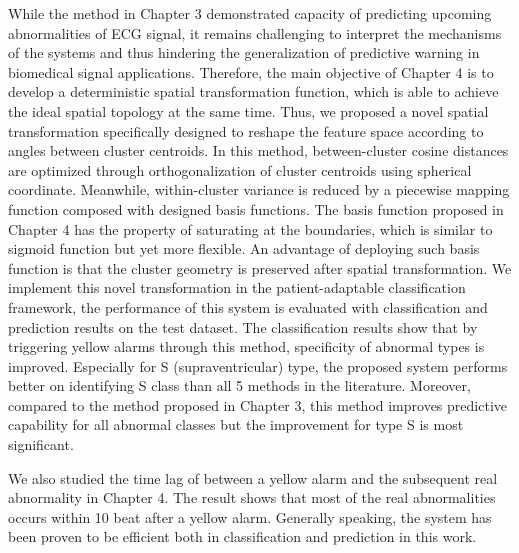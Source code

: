 While the method in Chapter 3 demonstrated capacity of predicting upcoming abnormalities of ECG signal, it remains challenging to interpret the mechanisms of the systems and thus hindering the generalization of predictive warning in biomedical signal applications. Therefore, the main objective of Chapter 4 is to develop a deterministic spatial transformation function, which is able to achieve the ideal spatial topology at the same time. Thus, we proposed a novel spatial transformation specifically designed to reshape the feature space according to angles between cluster centroids. In this method, between-cluster cosine distances are optimized through orthogonalization of cluster centroids using spherical coordinate. Meanwhile, within-cluster variance is reduced by a piecewise mapping function composed with designed basis functions. The basis function proposed in Chapter 4 has the property of saturating at the boundaries, which is similar to sigmoid function but yet more flexible. An advantage of deploying such basis function is that the cluster geometry is preserved after spatial transformation. 
We implement this novel transformation in the patient-adaptable classification framework, the performance of this system is evaluated with classification and prediction results on the test dataset. The classification results show that by triggering yellow alarms through this method, specificity of abnormal types is improved. Especially for S (supraventricular) type, the proposed system performs better on identifying S class than all 5 methods in the literature.
Moreover, compared to the method proposed in Chapter 3, this method improves predictive capability for all abnormal classes but the improvement for type S is most significant. 

We also studied the time lag of between a yellow alarm and the subsequent real abnormality in Chapter 4. The result shows that most of the real abnormalities occurs within 10 beat after a yellow alarm. Generally speaking, the system has been proven to be efficient both in classification and prediction in this work.



